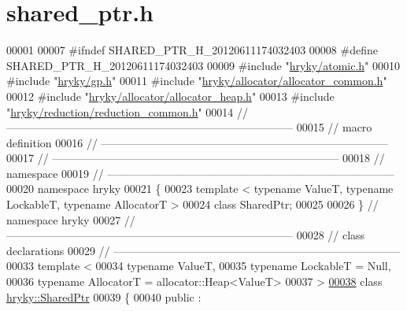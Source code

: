 \hypertarget{shared__ptr_8h_source}{\section{shared\-\_\-ptr.\-h}
}

\begin{DoxyCode}
00001 
00007 \textcolor{preprocessor}{#ifndef SHARED\_PTR\_H\_20120611174032403}
00008 \textcolor{preprocessor}{}\textcolor{preprocessor}{#define SHARED\_PTR\_H\_20120611174032403}
00009 \textcolor{preprocessor}{}\textcolor{preprocessor}{#include "\hyperlink{atomic_8h}{hryky/atomic.h}"}
00010 \textcolor{preprocessor}{#include "\hyperlink{gp_8h}{hryky/gp.h}"}
00011 \textcolor{preprocessor}{#include "\hyperlink{allocator__common_8h}{hryky/allocator/allocator_common.h}"}
00012 \textcolor{preprocessor}{#include "\hyperlink{allocator__heap_8h}{hryky/allocator/allocator_heap.h}"}
00013 \textcolor{preprocessor}{#include "\hyperlink{reduction__common_8h}{hryky/reduction/reduction_common.h}"}
00014 \textcolor{comment}{//
      ------------------------------------------------------------------------------}
00015 \textcolor{comment}{// macro definition}
00016 \textcolor{comment}{//
      ------------------------------------------------------------------------------}
00017 \textcolor{comment}{//
      ------------------------------------------------------------------------------}
00018 \textcolor{comment}{// namespace}
00019 \textcolor{comment}{//
      ------------------------------------------------------------------------------}
00020 \textcolor{keyword}{namespace }hryky
00021 \{
00023     \textcolor{keyword}{template} < \textcolor{keyword}{typename} ValueT, \textcolor{keyword}{typename} LockableT, \textcolor{keyword}{typename} AllocatorT >
00024     \textcolor{keyword}{class }SharedPtr;
00025 
00026 \} \textcolor{comment}{// namespace hryky}
00027 \textcolor{comment}{//
      ------------------------------------------------------------------------------}
00028 \textcolor{comment}{// class declarations}
00029 \textcolor{comment}{//
      ------------------------------------------------------------------------------}
00033 \textcolor{comment}{}\textcolor{keyword}{template} <
00034     \textcolor{keyword}{typename} ValueT,
00035     \textcolor{keyword}{typename} LockableT = Null,
00036     \textcolor{keyword}{typename} AllocatorT = allocator::Heap<ValueT>
00037 >
\hypertarget{shared__ptr_8h_source_l00038}{}\hyperlink{classhryky_1_1_shared_ptr}{00038} \textcolor{keyword}{class }\hyperlink{classhryky_1_1_shared_ptr}{hryky::SharedPtr}
00039 \{
00040 \textcolor{keyword}{public} :

\end{DoxyCode}
